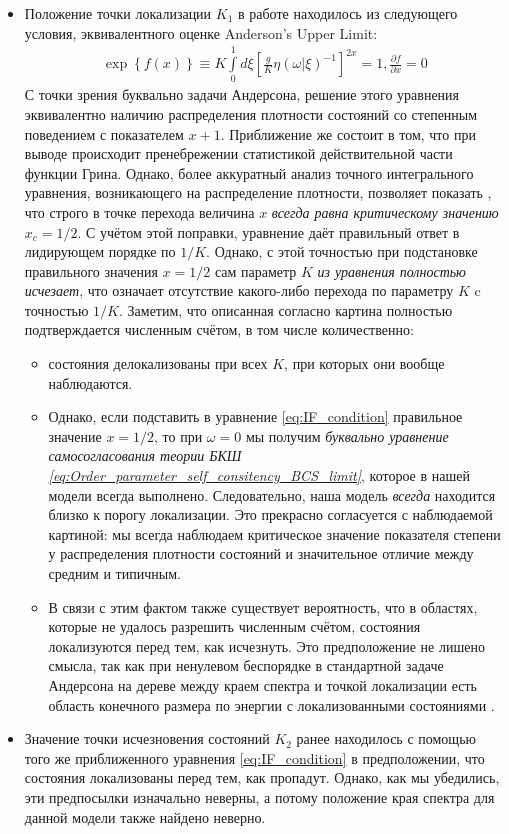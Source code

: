 \begin{itemize}
	\item Положение точки локализации $K_1$ в работе \cite{FI_microwave} находилось из следующего условия, эквивалентного оценке Anderson's Upper Limit:
	\begin{eqnarray}
		\label{eq:IF_condition}
		\exp \left\{ f(x) \right\} \equiv K \int \limits_0^1 d\xi \left[ \frac{g}{K} \eta\left(\omega|\xi\right)^{-1} \right]^{2 x}= 1, \frac{\partial f}{\partial x} = 0
	\end{eqnarray}
	С точки зрения буквально задачи Андерсона, решение этого уравнения эквивалентно наличию распределения плотности состояний со степенным поведением с показателем $x + 1$. Приближение же состоит в том, что при выводе происходит пренебрежении статистикой действительной части функции Грина. Однако, более аккуратный анализ точного интегрального уравнения, возникающего на распределение плотности, позволяет показать \cite{AAT}, что строго в точке перехода величина $x$ \textit{всегда равна критическому значению $x_c = 1/2$}. С учётом этой поправки, уравнение даёт правильный ответ в лидирующем порядке по $1/K$. Однако, с этой точностью при подстановке правильного значения $x = 1/2$ сам параметр $K$ \textit{из уравнения полностью исчезает}, что означает отсутствие какого-либо перехода по параметру $K$ c точностью $1/K$. Заметим, что описанная согласно \cite{AAT} картина полностью подтверждается численным счётом, в том числе количественно:
	\begin{itemize}
		\item состояния делокализованы при всех $K$, при которых они вообще наблюдаются.  
		\item Однако, если подставить в уравнение \eqref{eq:IF_condition} правильное значение $x = 1/2$, то при $\omega = 0$ мы получим \textit{буквально уравнение самосогласования теории БКШ \eqref{eq:Order_parameter_self_consitency_BCS_limit}}, которое в нашей модели всегда выполнено. Следовательно, наша модель \textit{всегда} находится близко к порогу локализации. Это прекрасно согласуется с наблюдаемой картиной: мы всегда наблюдаем критическое значение показателя степени у распределения плотности состояний и значительное отличие между средним и типичным.
		\item В связи с этим фактом также существует вероятность, что в областях, которые не удалось разрешить численным счётом, состояния локализуются перед тем, как исчезнуть. Это предположение не лишено смысла, так как при ненулевом беспорядке в стандартной задаче Андерсона на дереве между краем спектра и точкой локализации есть область конечного размера по энергии с локализованными состояниями \cite{Biroli_2010}.
	\end{itemize}
	\item Значение точки исчезновения состояний $K_2$ ранее находилось с помощью того же приближенного уравнения \eqref{eq:IF_condition} в предположении, что состояния локализованы перед тем, как пропадут. Однако, как мы убедились, эти предпосылки изначально неверны, а потому положение края спектра для данной модели также найдено неверно. 
\end{itemize}

